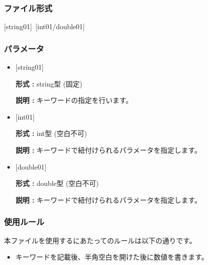 \documentclass[12pt,titlepage]{jarticle}
\begin{document}
\subsubsection{ファイル形式}
[string01]~[int01/double01]

\subsubsection{パラメータ}
\begin{itemize}
   \item  $[$string01$]$
   
   {\bf 形式 :} string型 (固定)

  {\bf 説明 :} キーワードの指定を行います。
   
   \item  $[$int01$]$
   
   {\bf 形式 :} int型 (空白不可)

  {\bf 説明 :} キーワードで紐付けられるパラメータを指定します。

   \item  $[$double01$]$
   
   {\bf 形式 :} double型 (空白不可)

  {\bf 説明 :} キーワードで紐付けられるパラメータを指定します。

 \end{itemize}

\subsubsection{使用ルール}
本ファイルを使用するにあたってのルールは以下の通りです。
\begin{itemize}
\item キーワードを記載後、半角空白を開けた後に数値を書きます。
\end{itemize}
\end{document}
